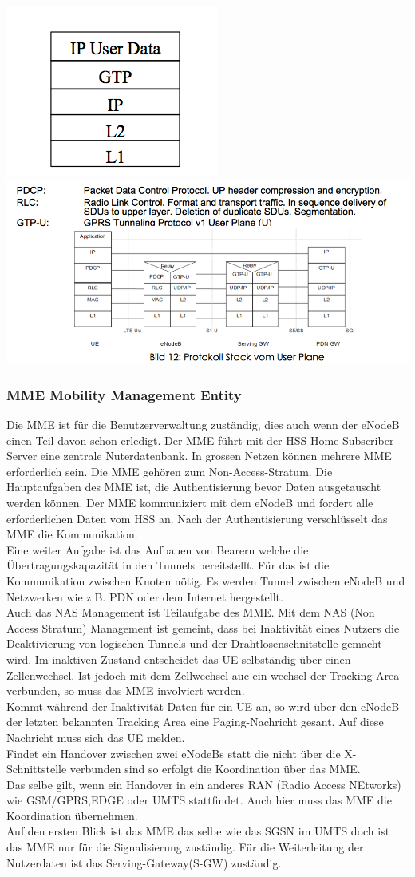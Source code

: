 \includegraphics[width = 0.2 \linewidth]{./Pics/LTE3.png} 
\includegraphics[width = 0.75 \linewidth]{./Pics/LTE4.png} \\
\subsubsection{MME Mobility Management Entity}
Die MME ist für die Benutzerverwaltung zuständig, dies auch wenn der eNodeB einen Teil davon schon erledigt. Der MME führt mit der HSS Home Subscriber Server eine zentrale Nuterdatenbank. In grossen Netzen können mehrere MME erforderlich sein. Die MME gehören zum Non-Access-Stratum. Die Hauptaufgaben des MME ist, die Authentisierung bevor Daten ausgetauscht werden können. Der MME kommuniziert mit dem eNodeB und fordert alle erforderlichen Daten vom HSS an. Nach der Authentisierung verschlüsselt das MME die Kommunikation. \\
Eine weiter Aufgabe ist das Aufbauen von Bearern welche die Übertragungskapazität in den Tunnels bereitstellt. Für das ist die Kommunikation zwischen Knoten nötig. Es werden Tunnel zwischen eNodeB und Netzwerken wie z.B. PDN oder dem Internet hergestellt. \\
Auch das NAS Management ist Teilaufgabe des MME.
Mit dem NAS (Non Access Stratum) Management ist gemeint, dass bei Inaktivität eines Nutzers die Deaktivierung von logischen Tunnels und der Drahtlosenschnitstelle gemacht wird. Im inaktiven Zustand entscheidet das UE selbständig über einen Zellenwechsel. Ist jedoch mit dem Zellwechsel auc ein wechsel der Tracking Area verbunden, so muss das MME involviert werden. \\
Kommt während der Inaktivität Daten für ein UE an, so wird über den eNodeB der letzten bekannten Tracking Area eine Paging-Nachricht gesant. Auf diese Nachricht muss sich das UE melden. \\
Findet ein Handover zwischen zwei eNodeBs statt die nicht über die X-Schnittstelle verbunden sind so erfolgt die Koordination über das MME. \\ 
Das selbe gilt, wenn ein Handover in ein anderes RAN (Radio Access NEtworks) wie GSM/GPRS,EDGE oder UMTS stattfindet. Auch hier muss das MME die Koordination übernehmen. \\
Auf den ersten Blick ist das MME das selbe wie das SGSN im UMTS doch ist das MME nur für die Signalisierung zuständig. Für die Weiterleitung der Nutzerdaten ist das Serving-Gateway(S-GW) zuständig.

